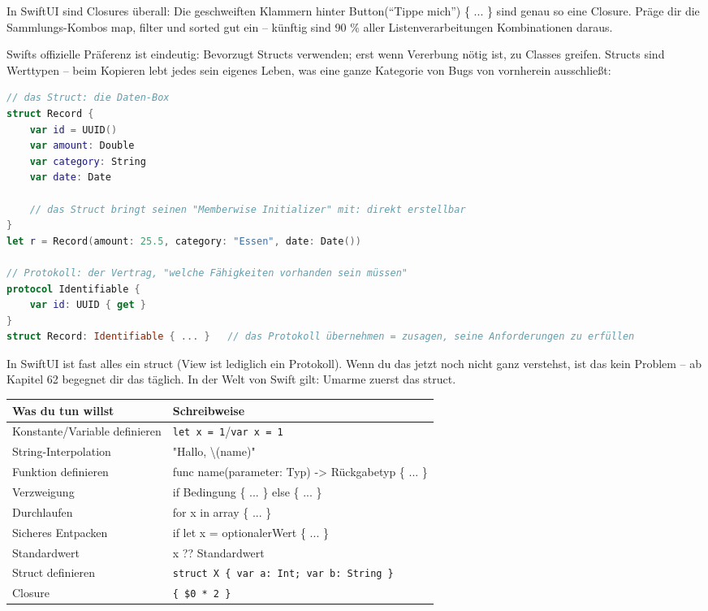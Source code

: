 In SwiftUI sind Closures überall: Die geschweiften Klammern hinter Button(“Tippe mich”) \{ ... \} sind genau so eine Closure. Präge dir die Sammlungs-Kombos map, filter und sorted gut ein – künftig sind 90 \% aller Listenverarbeitungen Kombinationen daraus.


Swifts offizielle Präferenz ist eindeutig: Bevorzugt Structs verwenden; erst wenn Vererbung nötig ist, zu Classes greifen. Structs sind Werttypen – beim Kopieren lebt jedes sein eigenes Leben, was eine ganze Kategorie von Bugs von vornherein ausschließt:

\begin{lstlisting}[language=Swift]
// das Struct: die Daten-Box
struct Record {
    var id = UUID()
    var amount: Double
    var category: String
    var date: Date

    // das Struct bringt seinen "Memberwise Initializer" mit: direkt erstellbar
}
let r = Record(amount: 25.5, category: "Essen", date: Date())

// Protokoll: der Vertrag, "welche Fähigkeiten vorhanden sein müssen"
protocol Identifiable {
    var id: UUID { get }
}
struct Record: Identifiable { ... }   // das Protokoll übernehmen = zusagen, seine Anforderungen zu erfüllen
\end{lstlisting}

In SwiftUI ist fast alles ein struct (View ist lediglich ein Protokoll). Wenn du das jetzt noch nicht ganz verstehst, ist das kein Problem – ab Kapitel 62 begegnet dir das täglich. In der Welt von Swift gilt: Umarme zuerst das struct.


\begin{center}
\begin{tabularx}{\linewidth}{|X|X|}
\hline
\textbf{Was du tun willst} & \textbf{Schreibweise} \tabularnewline
\hline
Konstante/Variable definieren & \texttt{let x = 1}/\texttt{var x = 1} \tabularnewline
String-Interpolation & "Hallo, \textbackslash{}(name)" \tabularnewline
Funktion definieren & func name(parameter: Typ) -> Rückgabetyp \{ ... \} \tabularnewline
Verzweigung & if Bedingung \{ ... \} else \{ ... \} \tabularnewline
Durchlaufen & for x in array \{ ... \} \tabularnewline
Sicheres Entpacken & if let x = optionalerWert \{ ... \} \tabularnewline
Standardwert & x ?? Standardwert \tabularnewline
Struct definieren & \texttt{struct X \{ var a: Int; var b: String \}} \tabularnewline
Closure & \texttt{\{ \$0 * 2 \}} \tabularnewline
\hline
\end{tabularx}
\end{center}

